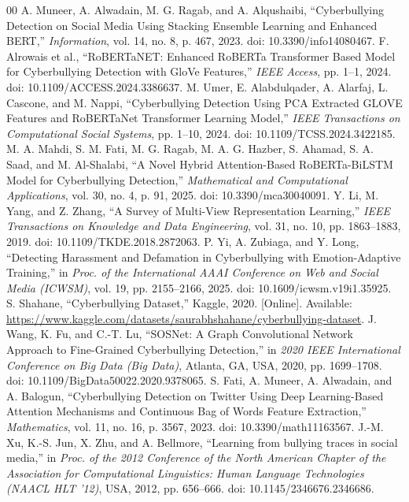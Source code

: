 \documentclass[journal]{IEEEtran}
\begin{document}
\begin{thebibliography}{00}
 A. Muneer, A. Alwadain, M. G. Ragab, and A. Alqushaibi, ``Cyberbullying Detection on Social Media Using Stacking Ensemble Learning and Enhanced BERT,'' \textit{Information}, vol. 14, no. 8, p. 467, 2023. doi: 10.3390/info14080467.
 F. Alrowais et al., ``RoBERTaNET: Enhanced RoBERTa Transformer Based Model for Cyberbullying Detection with GloVe Features,'' \textit{IEEE Access}, pp. 1--1, 2024. doi: 10.1109/ACCESS.2024.3386637.
 M. Umer, E. Alabdulqader, A. Alarfaj, L. Cascone, and M. Nappi, ``Cyberbullying Detection Using PCA Extracted GLOVE Features and RoBERTaNet Transformer Learning Model,'' \textit{IEEE Transactions on Computational Social Systems}, pp. 1--10, 2024. doi: 10.1109/TCSS.2024.3422185.
 M. A. Mahdi, S. M. Fati, M. G. Ragab, M. A. G. Hazber, S. Ahamad, S. A. Saad, and M. Al-Shalabi, ``A Novel Hybrid Attention-Based RoBERTa-BiLSTM Model for Cyberbullying Detection,'' \textit{Mathematical and Computational Applications}, vol. 30, no. 4, p. 91, 2025. doi: 10.3390/mca30040091.
 Y. Li, M. Yang, and Z. Zhang, ``A Survey of Multi-View Representation Learning,'' \textit{IEEE Transactions on Knowledge and Data Engineering}, vol. 31, no. 10, pp. 1863--1883, 2019. doi: 10.1109/TKDE.2018.2872063.
 P. Yi, A. Zubiaga, and Y. Long, ``Detecting Harassment and Defamation in Cyberbullying with Emotion-Adaptive Training,'' in \textit{Proc. of the International AAAI Conference on Web and Social Media (ICWSM)}, vol. 19, pp. 2155--2166, 2025. doi: 10.1609/icwsm.v19i1.35925.
 S. Shahane, ``Cyberbullying Dataset,'' Kaggle, 2020. [Online]. Available: \url{https://www.kaggle.com/datasets/saurabhshahane/cyberbullying-dataset}.
 J. Wang, K. Fu, and C.-T. Lu, ``SOSNet: A Graph Convolutional Network Approach to Fine-Grained Cyberbullying Detection,'' in \textit{2020 IEEE International Conference on Big Data (Big Data)}, Atlanta, GA, USA, 2020, pp. 1699--1708. doi: 10.1109/BigData50022.2020.9378065.
 S. Fati, A. Muneer, A. Alwadain, and A. Balogun, ``Cyberbullying Detection on Twitter Using Deep Learning-Based Attention Mechanisms and Continuous Bag of Words Feature Extraction,'' \textit{Mathematics}, vol. 11, no. 16, p. 3567, 2023. doi: 10.3390/math11163567.
 J.-M. Xu, K.-S. Jun, X. Zhu, and A. Bellmore, ``Learning from bullying traces in social media,'' in \textit{Proc. of the 2012 Conference of the North American Chapter of the Association for Computational Linguistics: Human Language Technologies (NAACL HLT '12)}, USA, 2012, pp. 656--666. doi: 10.1145/2346676.2346686.

\end{thebibliography}
\end{document}
